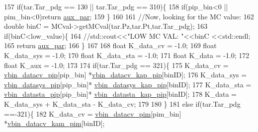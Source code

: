 \begin{DoxyCode}
157     \textcolor{keywordflow}{if}(tar.Tar\_pdg == 130 || tar.Tar\_pdg == 310)\{
158       \textcolor{keywordflow}{if}(pip\_bin<0 || pim\_bin<0)\textcolor{keywordflow}{return} \hyperlink{class_neutrino_flux_reweight_1_1_m_i_p_p_numi_kaon_yields_reweighter_a834bede67f164f8a08d50bd15f8ef02c}{aux\_par};
159     \}
160     
161     \textcolor{comment}{//Now, looking for the MC value:}
162     \textcolor{keywordtype}{double} binC = MCval->getMCval(tar.Pz,tar.Pt,tar.Tar\_pdg);
163     \textcolor{keywordflow}{if}(binC<low\_value)\{
164       \textcolor{comment}{//std::cout<<"LOW MC VAL: "<<binC <<std::endl;}
165       \textcolor{keywordflow}{return} \hyperlink{class_neutrino_flux_reweight_1_1_m_i_p_p_numi_kaon_yields_reweighter_a834bede67f164f8a08d50bd15f8ef02c}{aux\_par};
166     \}
167 
168     \textcolor{keywordtype}{float} K\_data\_cv  = -1.0;
169     \textcolor{keywordtype}{float} K\_data\_sys = -1.0;
170     \textcolor{keywordtype}{float} K\_data\_sta = -1.0;
171     \textcolor{keywordtype}{float} K\_data     = -1.0;
172     \textcolor{keywordtype}{float} K\_aux      = -1.0;
173     
174     \textcolor{keywordflow}{if}(tar.Tar\_pdg == 321)\{
175       K\_data\_cv  = \hyperlink{class_neutrino_flux_reweight_1_1_m_i_p_p_numi_kaon_yields_reweighter_a826bd079aef8a6915cea2dd8ccf03589}{vbin\_datacv\_pip}[pip\_bin] *\hyperlink{class_neutrino_flux_reweight_1_1_m_i_p_p_numi_kaon_yields_reweighter_a1d8321111a686ae97238fb98ed7c1a1b}{vbin\_datacv\_kap\_pip}[binID];
176       K\_data\_sys = \hyperlink{class_neutrino_flux_reweight_1_1_m_i_p_p_numi_kaon_yields_reweighter_a852ed8a2467fade867ca8abe0d0b3037}{vbin\_datasys\_pip}[pip\_bin]*
      \hyperlink{class_neutrino_flux_reweight_1_1_m_i_p_p_numi_kaon_yields_reweighter_a7a026f18f2ee99ed16e5dd2bdb5c96af}{vbin\_datasys\_kap\_pip}[binID];
177       K\_data\_sta = \hyperlink{class_neutrino_flux_reweight_1_1_m_i_p_p_numi_kaon_yields_reweighter_a258a6c0170a0ba06b44fad43b7dcff2f}{vbin\_datasta\_pip}[pip\_bin]*
      \hyperlink{class_neutrino_flux_reweight_1_1_m_i_p_p_numi_kaon_yields_reweighter_a014b0274aeb81973cc0579c218709031}{vbin\_datasta\_kap\_pip}[binID];
178       K\_data = K\_data\_sys + K\_data\_sta - K\_data\_cv;
179       
180     \}
181     \textcolor{keywordflow}{else} \textcolor{keywordflow}{if}(tar.Tar\_pdg ==-321)\{
182       K\_data\_cv  = \hyperlink{class_neutrino_flux_reweight_1_1_m_i_p_p_numi_kaon_yields_reweighter_a5c434b561304af4dd8d0a5145b07b62e}{vbin\_datacv\_pim}[pim\_bin] *\hyperlink{class_neutrino_flux_reweight_1_1_m_i_p_p_numi_kaon_yields_reweighter_a862186e4424a3514fc7441fc40bb2be3}{vbin\_datacv\_kam\_pim}[binID];

\end{DoxyCode}
